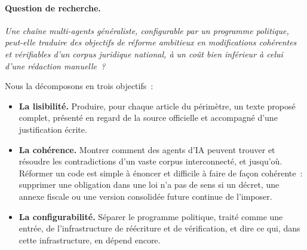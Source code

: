 \documentclass[11pt,a4paper]{article}
\begin{document}
\paragraph{Question de recherche.}
\emph{Une chaîne multi-agents généraliste, configurable par un programme politique, peut-elle traduire des objectifs de réforme ambitieux en modifications cohérentes et vérifiables d'un corpus juridique national, à un coût bien inférieur à celui d'une rédaction manuelle~?}

Nous la décomposons en trois objectifs~:
\begin{itemize}
  \item \textbf{La lisibilité.} Produire, pour chaque article du périmètre, un texte proposé complet, présenté en regard de la source officielle et accompagné d'une justification écrite.
  \item \textbf{La cohérence.} Montrer comment des agents d'IA peuvent trouver et résoudre les contradictions d'un vaste corpus interconnecté, et jusqu'où. Réformer un code est simple à énoncer et difficile à faire de façon cohérente~: supprimer une obligation dans une loi n'a pas de sens si un décret, une annexe fiscale ou une version consolidée future continue de l'imposer.
  \item \textbf{La configurabilité.} Séparer le programme politique, traité comme une entrée, de l'infrastructure de réécriture et de vérification, et dire ce qui, dans cette infrastructure, en dépend encore.
\end{itemize}
\end{document}
